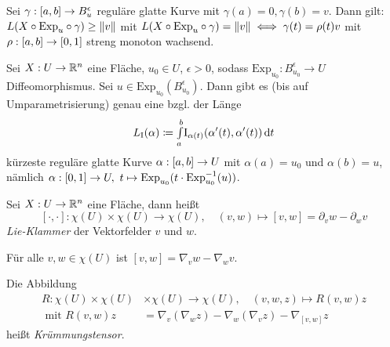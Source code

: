 \documentclass{cheat-sheet}
\newcommand{\I}{\mathrm{I}}
\newcommand{\Exp}{\mathrm{Exp}} %
\begin{document}

\begin{satz}
  Sei $\gamma : \left[ a, b \right] \to B_u^\epsilon$ reguläre glatte Kurve mit $\gamma(a) = 0, \gamma(b) = v$. Dann gilt: $L(X \circ \Exp_u \circ \gamma) \geq \norm{v}$ mit $L(X \circ \Exp_u \circ \gamma) = \norm{v} \iff \gamma(t) = \rho(t)v$ mit $\rho : \left[ a, b \right] \to \left[ 0, 1 \right]$ streng monoton wachsend.
\end{satz}

\begin{satz}
  Sei $X : U \to \mathbb{R}^n$ eine Fläche, $u_0 \in U$, $\epsilon > 0$, sodass $\Exp_{u_0} : B_{u_0}^{\epsilon} \to U$ Diffeomorphismus. Sei $u \in \Exp_{u_0}(B_{u_0}^{\epsilon})$. Dann gibt es (bis auf Umparametrisierung) genau eine bzgl. der Länge
  \[ L_\I(\alpha) \coloneqq \Int{a}{b}{\I_{\alpha(t)}(\alpha'(t), \alpha'(t))}{t} \]
  kürzeste reguläre glatte Kurve $\alpha : \left[ a, b \right] \to U$ mit $\alpha(a) = u_0$ und $\alpha(b) = u$, nämlich $\alpha : \cinterval{0}{1} \to U, \  t \mapsto \Exp_{u_0}(t \cdot \Exp_{u_0}^{-1}(u))$.
\end{satz}



\begin{defn}
  Sei $X : U \to \mathbb{R}^n$ eine Fläche, dann heißt
  \[
    [\cdot,\cdot] : \chi(U) \times \chi(U) \to \chi(U), \quad
    (v, w) \mapsto [v, w] = \partial_v w - \partial_w v
  \]
  \emph{Lie-Klammer} der Vektorfelder $v$ und $w$.
\end{defn}

\begin{satz}
  Für alle $v, w \in \chi(U)$ ist $[v, w] = \nabla_v w - \nabla_w v$.
\end{satz}


\begin{defn}
  Die Abbildung
  \begin{align*}
    R : \chi(U) \times \chi(U) &\times \chi(U) \to \chi(U), \quad (v, w, z) \mapsto R(v, w) z \\
    \text{ mit } R(v, w) z &= \nabla_v (\nabla_w z) - \nabla_w (\nabla_v z) - \nabla_{[v, w]} z
  \end{align*}
  heißt \emph{Krümmungstensor}.
\end{defn}
\end{document}

